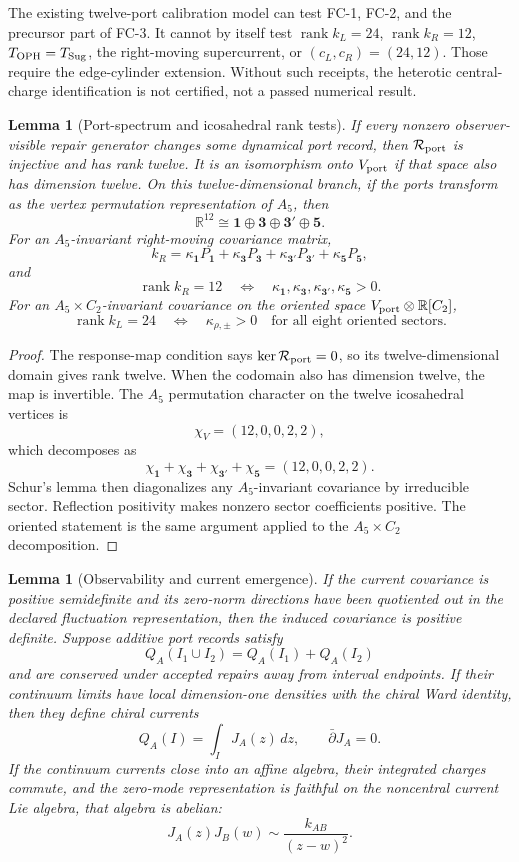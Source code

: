 \documentclass[11pt]{article}
\newtheorem{lemma}[theorem]{Lemma}
\theoremstyle{remark}
\theoremstyle{plain}
\newcommand{\OPH}{\mathrm{OPH}}
\newcommand{\calR}{\mathcal R}
\begin{document}
The existing twelve-port calibration model can test FC-1, FC-2, and the precursor part of FC-3. It cannot
by itself test \(\operatorname{rank}k_L=24\), \(\operatorname{rank}k_R=12\), \(T_{\OPH}=T_{\rm Sug}\),
the right-moving supercurrent, or \((c_L,c_R)=(24,12)\). Those require the edge-cylinder extension.
Without such receipts, the heterotic central-charge identification is not certified,
not a passed numerical result.

\begin{lemma}[Port-spectrum and icosahedral rank tests]
If every nonzero observer-visible repair generator changes some dynamical port record, then
\(\calR_{\rm port}\) is injective and has rank twelve. It is an
isomorphism onto \(V_{\rm port}\) if that space also has dimension twelve.
On this twelve-dimensional branch, if the ports transform as the vertex permutation
representation of \(A_5\), then
\[
\mathbb R^{12}\cong\mathbf1\oplus\mathbf3\oplus\mathbf3'\oplus\mathbf5.
\]
For an \(A_5\)-invariant right-moving covariance matrix,
\[
k_R=\kappa_{\mathbf1}P_{\mathbf1}
+\kappa_{\mathbf3}P_{\mathbf3}
+\kappa_{\mathbf3'}P_{\mathbf3'}
+\kappa_{\mathbf5}P_{\mathbf5},
\]
and
\[
\operatorname{rank}k_R=12
\quad\Longleftrightarrow\quad
\kappa_{\mathbf1},\kappa_{\mathbf3},\kappa_{\mathbf3'},\kappa_{\mathbf5}>0.
\]
For an \(A_5\times C_2\)-invariant covariance on the oriented space
\(V_{\rm port}\otimes\mathbb R[C_2]\),
\[
\operatorname{rank}k_L=24
\quad\Longleftrightarrow\quad
\kappa_{\rho,\pm}>0
\quad\text{for all eight oriented sectors.}
\]
\end{lemma}

\begin{proof}
The response-map condition says \(\ker\calR_{\rm port}=0\), so its
twelve-dimensional domain gives rank twelve. When the codomain also has
dimension twelve, the map is invertible. The \(A_5\) permutation character on the
twelve icosahedral vertices is
\[
\chi_V=(12,0,0,2,2),
\]
which decomposes as
\[
\chi_{\mathbf1}+\chi_{\mathbf3}+\chi_{\mathbf3'}+\chi_{\mathbf5}
=(12,0,0,2,2).
\]
Schur's lemma then diagonalizes any \(A_5\)-invariant covariance by irreducible sector. Reflection
positivity makes nonzero sector coefficients positive. The oriented statement is the same argument
applied to the \(A_5\times C_2\) decomposition.
\end{proof}

\begin{lemma}[Observability and current emergence]
If the current covariance is positive semidefinite and its zero-norm
directions have been quotiented out in the declared fluctuation
representation, then the induced covariance is positive definite.
Suppose additive port records satisfy
\[
Q_A(I_1\cup I_2)=Q_A(I_1)+Q_A(I_2)
\]
and are conserved under accepted repairs away from interval endpoints.
If their continuum limits have local dimension-one densities with the
chiral Ward identity, then they define chiral currents
\[
Q_A(I)=\int_I J_A(z)\,dz,
\qquad
\bar\partial J_A=0.
\]
If the continuum currents close into an affine algebra, their integrated
charges commute, and the zero-mode representation is faithful on the
noncentral current Lie algebra, that algebra is abelian:
\[
J_A(z)J_B(w)\sim\frac{k_{AB}}{(z-w)^2}.
\]
\end{lemma}
\end{document}
